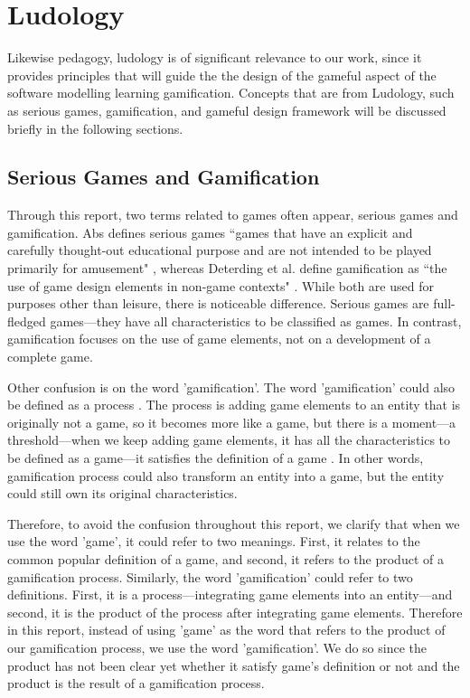 \documentclass[12pt, a4paper]{report}
\begin{document}
\section{Ludology}
Likewise pedagogy, ludology is of significant relevance to our work, since it provides principles that will guide the the design of the gameful aspect of the software modelling learning gamification. Concepts that are from Ludology, such as serious games, gamification, and gameful design framework \cite{deterding2015lens} will be discussed briefly in the following sections.   

\subsection{Serious Games and Gamification}
Through this report, two terms related to games often appear, serious games and gamification. Abs defines serious games ``games that have an explicit and carefully thought-out educational purpose and are not intended to be played primarily for amusement" \cite{abt1987serious}, whereas Deterding et al. define gamification as ``the use of game design elements in non-game contexts" \cite{deterding2011game}. While both are used for purposes other than leisure, there is noticeable difference. Serious games are full-fledged games---they have all characteristics to be classified as games. In contrast, gamification focuses on the use of game elements, not on a development of a complete game. 

Other confusion is on the word 'gamification'. The word 'gamification' could also be defined as a process \cite{werbach2014re}. The process is adding game elements to an entity that is originally not a game, so it becomes more like a game, but there is a moment---a threshold---when we keep adding game elements, it has all the characteristics to be defined as a game---it satisfies the definition of a game \cite{yohannis2014defining}. In other words, gamification process could also transform an entity into a game, but the entity could still own its original characteristics. 

Therefore, to avoid the confusion throughout this report, we clarify that when we use the word 'game', it could refer to two meanings. First, it relates to the common popular definition of a game, and second, it refers to the product of a gamification process. Similarly, the word 'gamification' could refer to two definitions. First, it is a process---integrating game elements into an entity---and second, it is the product of the process after integrating game elements. Therefore in this report, instead of using 'game' as the word that refers to the product of our gamification process, we use the word 'gamification'. We do so since the product has not been clear yet whether it satisfy game's definition or not and the product is the result of a gamification process.   
\end{document}
